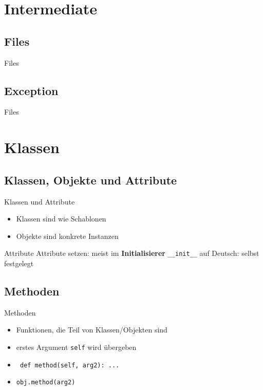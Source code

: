 \section{Intermediate}

\subsection{Files}
\begin{frame}{Files}
\end{frame}

\subsection{Exception}
\begin{frame}{Files}
\end{frame}

\section{Klassen}
\subsection{Klassen, Objekte und Attribute}
\begin{frame}{Klassen und Attribute}
	\begin{itemize}
		\item<1-> Klassen sind wie Schablonen
		\item<2-> Objekte sind konkrete Instanzen
	\end{itemize}
\end{frame}

\begin{frame}{Attribute}
	Attribute setzen: meist im \textbf{Initialisierer} \alert{\tt \_\_init\_\_}
	auf Deutsch: selbst festgelegt
\end{frame}

\subsection{Methoden}
\begin{frame}{Methoden}
	\begin{itemize}
		\item Funktionen, die Teil von Klassen/Objekten sind
		\item<2-> erstes Argument \texttt{self} wird übergeben
		\item<3-> \texttt{	def method(self, arg2): ...}
		\item<3-> \texttt{obj.method(arg2)}
	\end{itemize}
\end{frame}

